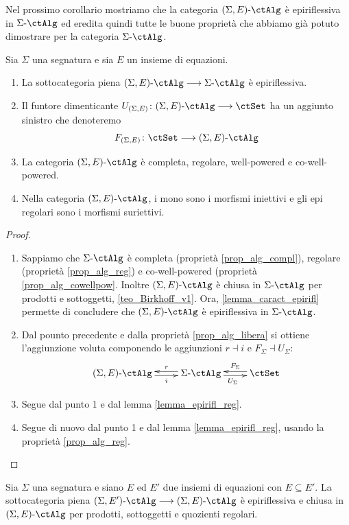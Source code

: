 Nel prossimo corollario mostriamo che la categoria \(\ctSEAlg\) è epiriflessiva in \(\ctSAlg\) ed eredita quindi tutte le
buone proprietà che abbiamo già potuto dimostrare per la categoria \(\ctSAlg\).

\begin{corollary}\label{cor_alg_reg}
 Sia \(\Sigma\) una segnatura e sia \(E\) un insieme di equazioni.
 \begin{enumerate}
  \item La sottocategoria piena \(\ctSEAlg \fun \ctSAlg\) è epiriflessiva.
  \item Il funtore dimenticante \(U_{(\Sigma,E)} \colon \ctSEAlg \fun \ctSet\) ha un aggiunto sinistro che denoteremo
        \[F_{(\Sigma,E)} \colon \ctSet \fun \ctSEAlg\]
  \item La categoria \(\ctSEAlg\) è completa, regolare, well-powered e co-well-powered.
  \item Nella categoria \(\ctSEAlg\), i mono sono i morfismi iniettivi e gli epi regolari sono i morfismi suriettivi.
 \end{enumerate}
\end{corollary}

\begin{proof}
 \begin{enumerate}
  \item Sappiamo che \(\ctSAlg\) è completa (proprietà \ref{prop_alg_compl}), regolare (proprietà \ref{prop_alg_reg}) e
        co-well-powered (proprietà \ref{prop_alg_cowellpow}. Inoltre \(\ctSEAlg\) è chiusa in \(\ctSAlg\) per prodotti e sottoggetti, \ref{teo_Birkhoff_v1}. Ora, \ref{lemma_caract_epirifl} permette di concludere che \(\ctSEAlg\) è epiriflessiva  in \(\ctSAlg\).
  \item Dal pounto precedente e dalla proprietà \ref{prop_alg_libera} si ottiene l'aggiunzione voluta componendo le aggiunzioni
        \(r \dashv i\) e \(F_{\Sigma} \dashv U_{\Sigma} \colon\)
        \[\xymatrix{\ctSEAlg \ar@<-0.5ex>[r]_-{i} & \ctSAlg \ar@<-0.5ex>[r]_{U_{\Sigma}} \ar@<-0.5ex>[l]_-{r} & \ctSet \ar@<-0.5ex>[l]_-{F_{\Sigma}}}\]
  \item Segue dal punto 1 e dal lemma \ref{lemma_epirifl_reg}.
  \item Segue di nuovo dal punto 1 e dal lemma \ref{lemma_epirifl_reg}, usando la proprietà \ref{prop_alg_reg}.
 \end{enumerate}
\end{proof}

\begin{corollary}\label{cor_alg_EE'}
 Sia \(\Sigma\) una segnatura e siano \(E\) ed \(E'\) due insiemi di equazioni con \(E \subseteq E'\). La sottocategoria piena
 \(\ctSEEAlg \fun \ctSEAlg\) è epiriflessiva e chiusa in \(\ctSEAlg\) per prodotti, sottoggetti e quozienti regolari.
\end{corollary}


